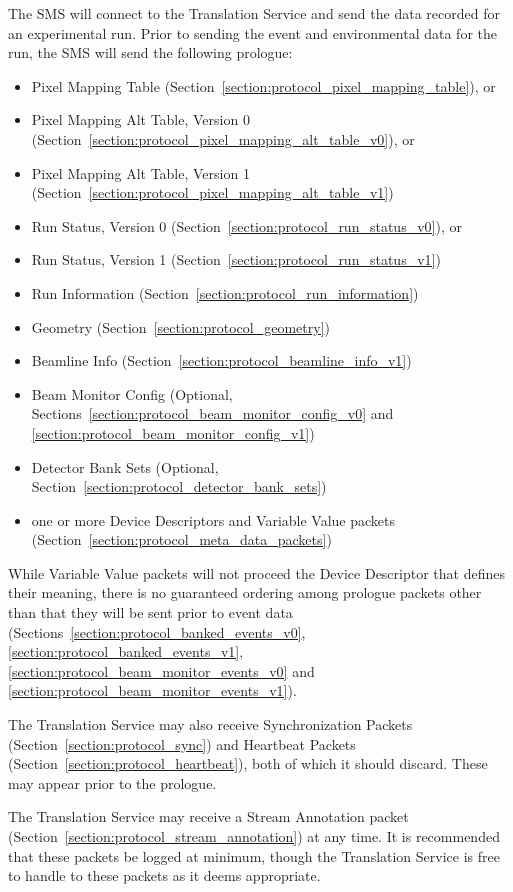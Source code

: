 The SMS will connect to the Translation Service and send the data recorded
for an experimental run. Prior to sending the event and environmental data
for the run, the SMS will send the following prologue:
\begin{itemize}
\item Pixel Mapping Table (Section~\ref{section:protocol_pixel_mapping_table}), or
\item Pixel Mapping Alt Table, Version 0 (Section~\ref{section:protocol_pixel_mapping_alt_table_v0}), or
\item Pixel Mapping Alt Table, Version 1 (Section~\ref{section:protocol_pixel_mapping_alt_table_v1})
\item Run Status, Version 0 (Section~\ref{section:protocol_run_status_v0}), or
\item Run Status, Version 1 (Section~\ref{section:protocol_run_status_v1})
\item Run Information (Section~\ref{section:protocol_run_information})
\item Geometry (Section~\ref{section:protocol_geometry})
\item Beamline Info (Section~\ref{section:protocol_beamline_info_v1})
\item Beam Monitor Config (Optional, Sections~\ref{section:protocol_beam_monitor_config_v0} and \ref{section:protocol_beam_monitor_config_v1})
\item Detector Bank Sets (Optional, Section~\ref{section:protocol_detector_bank_sets})
\item one or more Device Descriptors and Variable Value packets
(Section~\ref{section:protocol_meta_data_packets})
\end{itemize}
While Variable Value packets will not proceed the Device Descriptor that
defines their meaning, there is no guaranteed ordering among prologue
packets other than that they will be sent prior to event data
(Sections~\ref{section:protocol_banked_events_v0},
\ref{section:protocol_banked_events_v1},
\ref{section:protocol_beam_monitor_events_v0}
and \ref{section:protocol_beam_monitor_events_v1}).

The Translation Service
may also receive Synchronization Packets (Section~\ref{section:protocol_sync})
and Heartbeat Packets (Section~\ref{section:protocol_heartbeat}), both of
which it should discard. These may appear prior to the prologue.

The Translation Service may receive a Stream Annotation packet
(Section~\ref{section:protocol_stream_annotation}) at any time. It is
recommended that these packets be logged at minimum, though the Translation
Service is free to handle to these packets as it deems appropriate.

